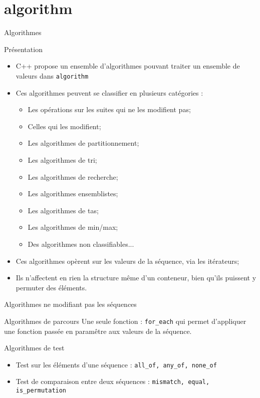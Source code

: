 \documentclass[handout,10pt]{beamer}
\newcommand{\includepartcode}[4][cpp]{

}
\begin{document}
\section{algorithm}

\begin{frame}[fragile]{Algorithmes}
\tiny
\begin{block}{Présentation}
 \begin{itemize}
  \item C++ propose un ensemble d'algorithmes pouvant traiter un ensemble de valeurs dans \lstinline$algorithm$
  \item Ces algorithmes peuvent se classifier en plusieurs catégories :
  \begin{itemize}
  \item Les opérations sur les suites qui ne les modifient pas;
  \item Celles qui les modifient;
  \item Les algorithmes de partitionnement;
  \item Les algorithmes de tri;
  \item Les algorithmes de recherche;
  \item Les algorithmes ensemblistes;
  \item Les algorithmes de tas;
  \item Les algorithmes de min/max;
  \item Des algorithmes non classifiables...
  \end{itemize}
 \item Ces algorithmes opèrent sur les valeurs de la séquence, via les itérateurs;
 \item Ils n'affectent en rien la structure même d'un conteneur, bien qu'ils puissent y permuter des éléments.
 \end{itemize}
\end{block}
\end{frame}

\begin{frame}[fragile]{Algorithmes ne modifiant pas les séquences}
\tiny
\begin{block}{Algorithmes de parcours}
Une seule fonction : \lstinline$for_each$ qui permet d'appliquer une fonction passée en paramêtre aux valeurs de la séquence.
\end{block}

\begin{block}{Algorithmes de test}
\begin{itemize}
 \item Test sur les éléments d'une séquence : \lstinline$all_of, any_of, none_of$
 \item Test de comparaison entre deux séquences : \lstinline$mismatch, equal, is_permutation$
\end{itemize}
\end{block}
\end{frame}
  
\end{document}
